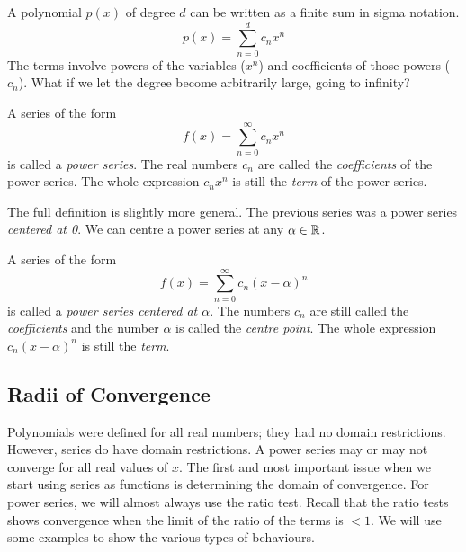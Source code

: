 \documentclass[fleqn]{report}
\begin{document}
A polynomial $p(x)$ of degree $d$ can be written as a finite
sum in sigma notation. 
\begin{equation*}
p(x) = \sum_{n=0}^d c_n x^n
\end{equation*}
The terms involve powers of the variables ($x^n$) and
coefficients of those powers ($c_n$). What if we let the
degree become arbitrarily large, going to infinity? 

\begin{defn}
A series of the form
\begin{equation*}
f(x) = \sum_{n=0}^\infty c_n x^n
\end{equation*}
is called a \emph{power series}. The real numbers $c_n$ are
called the \emph{coefficients} of the power series. The whole
expression $c_nx^n$ is still the \emph{term} of the power
series.
\end{defn}

The full definition is slightly more general. The previous
series was a power series \emph{centered at 0}. We can centre
a power series at any $\alpha \in \mathbb{R}$. 

\begin{defn} 
A series of the form
\begin{equation*}
f(x) = \sum_{n=0}^\infty c_n (x-\alpha)^n
\end{equation*}
is called a \emph{power series centered at $\alpha$}. The
numbers $c_n$ are still called the \emph{coefficients} and the
number $\alpha$ is called the \emph{centre point}. The whole
expression $c_n(x-\alpha)^n$ is still the \emph{term}.
\end{defn}

\subsection{Radii of Convergence}
\label{radii-of-convergence}

Polynomials were defined for all real numbers; they had no
domain restrictions. However, series do have domain
restrictions. A power series may or may not converge for all
real values of $x$. The first and most important issue
when we start using series as functions is determining the domain of
convergence. For power series, we will almost always use the
ratio test. Recall that the ratio tests shows convergence when
the limit of the ratio of the terms is $<1$. We will use some
examples to show the various types of behaviours.
\end{document}
